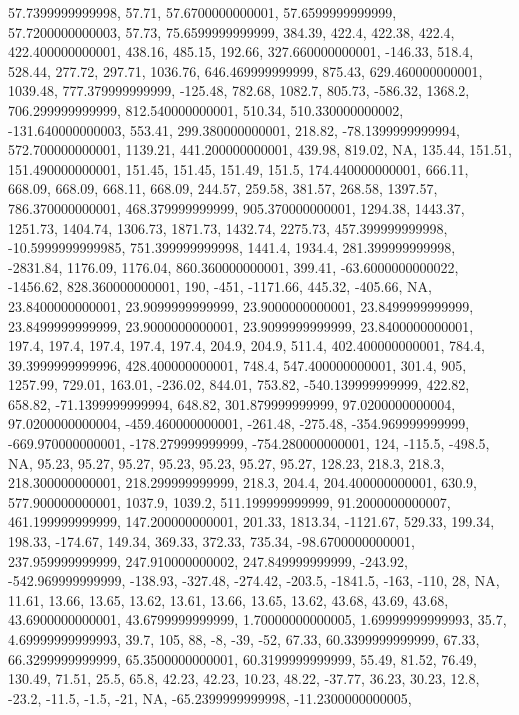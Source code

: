 \documentclass[
]{article}
\begin{document}
57.7399999999998, 57.71, 57.6700000000001, 57.6599999999999,
57.7200000000003, 57.73, 75.6599999999999, 384.39, 422.4, 422.38, 422.4,
422.400000000001, 438.16, 485.15, 192.66, 327.660000000001, -146.33,
518.4, 528.44, 277.72, 297.71, 1036.76, 646.469999999999, 875.43,
629.460000000001, 1039.48, 777.379999999999, -125.48, 782.68, 1082.7,
805.73, -586.32, 1368.2, 706.299999999999, 812.540000000001, 510.34,
510.330000000002, -131.640000000003, 553.41, 299.380000000001, 218.82,
-78.1399999999994, 572.700000000001, 1139.21, 441.200000000001, 439.98,
819.02, NA, 135.44, 151.51, 151.490000000001, 151.45, 151.45, 151.49,
151.5, 174.440000000001, 666.11, 668.09, 668.09, 668.11, 668.09, 244.57,
259.58, 381.57, 268.58, 1397.57, 786.370000000001, 468.379999999999,
905.370000000001, 1294.38, 1443.37, 1251.73, 1404.74, 1306.73, 1871.73,
1432.74, 2275.73, 457.399999999998, -10.5999999999985, 751.399999999998,
1441.4, 1934.4, 281.399999999998, -2831.84, 1176.09, 1176.04,
860.360000000001, 399.41, -63.6000000000022, -1456.62, 828.360000000001,
190, -451, -1171.66, 445.32, -405.66, NA, 23.8400000000001,
23.9099999999999, 23.9000000000001, 23.8499999999999, 23.8499999999999,
23.9000000000001, 23.9099999999999, 23.8400000000001, 197.4, 197.4,
197.4, 197.4, 197.4, 204.9, 204.9, 511.4, 402.400000000001, 784.4,
39.3999999999996, 428.400000000001, 748.4, 547.400000000001, 301.4, 905,
1257.99, 729.01, 163.01, -236.02, 844.01, 753.82, -540.139999999999,
422.82, 658.82, -71.1399999999994, 648.82, 301.879999999999,
97.0200000000004, 97.0200000000004, -459.460000000001, -261.48, -275.48,
-354.969999999999, -669.970000000001, -178.279999999999,
-754.280000000001, 124, -115.5, -498.5, NA, 95.23, 95.27, 95.27, 95.23,
95.23, 95.27, 95.27, 128.23, 218.3, 218.3, 218.300000000001,
218.299999999999, 218.3, 204.4, 204.400000000001, 630.9,
577.900000000001, 1037.9, 1039.2, 511.199999999999, 91.2000000000007,
461.199999999999, 147.200000000001, 201.33, 1813.34, -1121.67, 529.33,
199.34, 198.33, -174.67, 149.34, 369.33, 372.33, 735.34,
-98.6700000000001, 237.959999999999, 247.910000000002, 247.849999999999,
-243.92, -542.969999999999, -138.93, -327.48, -274.42, -203.5, -1841.5,
-163, -110, 28, NA, 11.61, 13.66, 13.65, 13.62, 13.61, 13.66, 13.65,
13.62, 43.68, 43.69, 43.68, 43.6900000000001, 43.6799999999999,
1.70000000000005, 1.69999999999993, 35.7, 4.69999999999993, 39.7, 105,
88, -8, -39, -52, 67.33, 60.3399999999999, 67.33, 66.3299999999999,
65.3500000000001, 60.3199999999999, 55.49, 81.52, 76.49, 130.49, 71.51,
25.5, 65.8, 42.23, 42.23, 10.23, 48.22, -37.77, 36.23, 30.23, 12.8,
-23.2, -11.5, -1.5, -21, NA, -65.2399999999998, -11.2300000000005,
\end{document}
